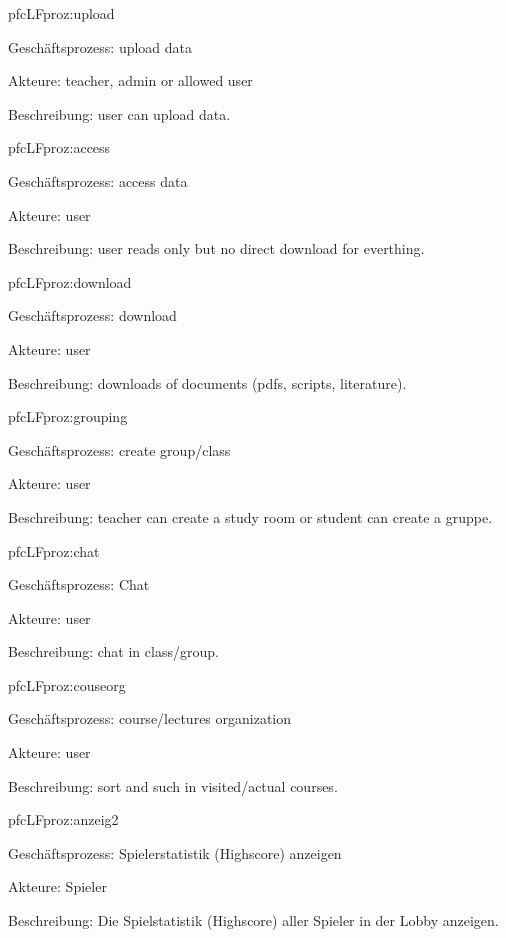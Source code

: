 \begin{description}[leftmargin=5em, style=sameline]
	\begin{lhp}{pfc}{LF}{proz:upload}
		\item [Geschäftsprozess:] upload data
		\item [Akteure:] teacher, admin or allowed user
		\item [Beschreibung:] user can upload data.
	\end{lhp}
	
	\begin{lhp}{pfc}{LF}{proz:access}
		\item [Geschäftsprozess:] access data
		\item [Akteure:] user
		\item [Beschreibung:] user reads only but no direct download for everthing.
	\end{lhp}
	
	\begin{lhp}{pfc}{LF}{proz:download}
		\item [Geschäftsprozess:] download
		\item [Akteure:] user
		\item [Beschreibung:] downloads of documents (pdfs, scripts, literature).
	\end{lhp}
	
	\begin{lhp}{pfc}{LF}{proz:grouping}
		\item [Geschäftsprozess:] create group/class
		\item [Akteure:] user
		\item [Beschreibung:] teacher can create a study room or student can create a gruppe.
	\end{lhp}	
		
	\begin{lhp}{pfc}{LF}{proz:chat}
		\item [Geschäftsprozess:] Chat
		\item [Akteure:] user
		\item [Beschreibung:] chat in class/group.
	\end{lhp}
	
	\begin{lhp}{pfc}{LF}{proz:couseorg}
		\item [Geschäftsprozess:] course/lectures organization		
		\item [Akteure:] user
		\item [Beschreibung:] sort and such in visited/actual courses.
	\end{lhp}
	
	\begin{lhp}{pfc}{LF}{proz:anzeig2}
		\item [Geschäftsprozess:] Spielerstatistik (Highscore) anzeigen
		\item [Akteure:] Spieler
		\item [Beschreibung:] Die Spielstatistik (Highscore) aller Spieler in der Lobby anzeigen.
	\end{lhp}
	

\end{description}
